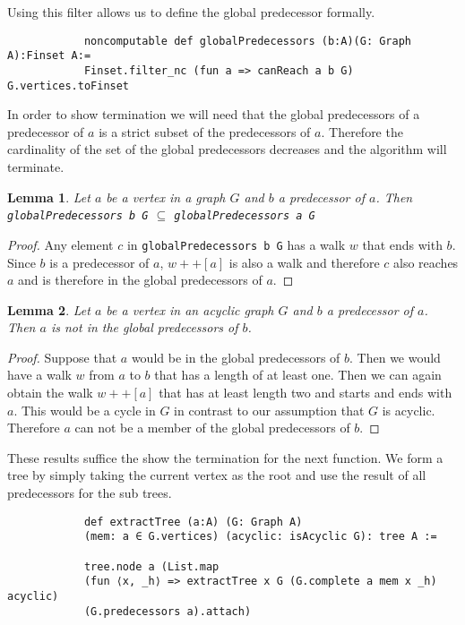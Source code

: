 \documentclass{article}
\newtheorem{lemma}{Lemma}
\begin{document}
        Using this filter allows us to define the global predecessor formally.

        \begin{lstlisting}
            noncomputable def globalPredecessors (b:A)(G: Graph A):Finset A:=
            Finset.filter_nc (fun a => canReach a b G) G.vertices.toFinset
        \end{lstlisting}

        In order to show termination we will need that the global predecessors of a predecessor of $a$ is a strict subset of the predecessors of $a$. Therefore the cardinality of the set of the global predecessors decreases and the algorithm will terminate.

        \begin{lemma}
            Let $a$ be a vertex in a graph $G$ and $b$ a predecessor of $a$. Then \texttt{globalPredecessors b G} $\subseteq$ \texttt{globalPredecessors a G}
        \end{lemma}
        \begin{proof}
            Any element $c$ in \texttt{globalPredecessors b G} has a walk $w$ that ends with $b$. Since $b$ is a predecessor of $a$, $w++[a]$ is also a walk and therefore $c$ also reaches $a$ and is therefore in the global predecessors of $a$. 
        \end{proof}

        \begin{lemma}
            Let $a$ be a vertex in an acyclic graph $G$ and $b$ a predecessor of $a$.
            Then $a$ is not in the global predecessors of $b$.
        \end{lemma}
        \begin{proof}
            Suppose that $a$ would be in the global predecessors of $b$. Then we would have a walk $w$ from $a$ to $b$ that has a length of at least one. Then we can again obtain the walk $w++[a]$ that has at least length two and starts and ends with $a$. This would be a cycle in $G$ in contrast to our assumption that $G$ is acyclic. Therefore $a$ can not be a member of the global predecessors of $b$.
        \end{proof}

        These results suffice the show the termination for the next function. We form a tree by simply taking the current vertex as the root and use the result of all predecessors for the sub trees.

        \begin{lstlisting}
            def extractTree (a:A) (G: Graph A) 
            (mem: a ∈ G.vertices) (acyclic: isAcyclic G): tree A :=

            tree.node a (List.map 
            (fun ⟨x, _h⟩ => extractTree x G (G.complete a mem x _h) acyclic) 
            (G.predecessors a).attach)
        \end{lstlisting}
\end{document}

